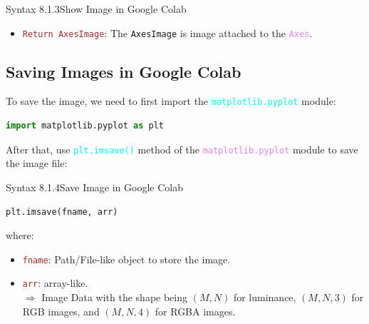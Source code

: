 \documentclass{book}
\begin{document}
\begin{synBox}{Syntax 8.1.3}{Show Image in Google Colab}
\begin{itemize}
        \begin{itemize}
            \item \texttt{imshow} scales elements of the NumPy array so that the \textcolor{violet}{minimum value is mapped to 0} , the \textcolor{violet}{maximum value is mapped to 1} and the \textcolor{violet}{intermediate values are mapped to interval [0, 1] by linear function}.
            \item \texttt{imshow} can be called with \texttt{vmin} and \texttt{vmax} so that \textcolor{violet}{all elements of the array smaller/equal to \texttt{vmin} are mapped to 0}, \textcolor{violet}{all elements of the array larger/equal to \texttt{vmax} are mapped to 1} and \textcolor{violet}{elements in between are mapped linearly to the interval [0, 1]}.
        \end{itemize}
        \item \textcolor{brown}{\texttt{Return AxesImage}}: The \texttt{AxesImage} is image attached to the \textcolor{violet}{\texttt{Axes}}.
    \end{itemize}
\end{synBox}
\subsection{Saving Images in Google Colab}
To save the image, we need to first import the \textcolor{cyan}{\texttt{matplotlib.pyplot}} module:
\begin{lstlisting}[language=Python, basicstyle=\ttfamily\small, keywordstyle=\color{blue}, commentstyle=\color{forestgreen}, stringstyle=\color{red}, showstringspaces=false]
                                    import matplotlib.pyplot as plt
\end{lstlisting}
After that, use \textcolor{cyan}{\texttt{plt.imsave()}} method of the \textcolor{violet}{\texttt{matplotlib.pyplot}} module to save the image file:
\begin{synBox}{Syntax 8.1.4}{Save Image in Google Colab}
    \raggedright
    \begin{lstlisting}[language=Python, basicstyle=\ttfamily\small, keywordstyle=\color{blue}, commentstyle=\color{forestgreen}, stringstyle=\color{red}, showstringspaces=false]
                                        plt.imsave(fname, arr)
    \end{lstlisting}
    where:\\
    \begin{itemize}
        \item \textcolor{brown}{\texttt{fname}}: Path/File-like object to store the image.
        \item \textcolor{brown}{\texttt{arr}}: array-like.\\
        $\Rightarrow$ Image Data with the shape being $(M, N)$ for luminance, $(M, N, 3)$ for RGB images, and $(M, N, 4)$ for RGBA images.
    \end{itemize}
\end{synBox}
\newpage
\end{document}
